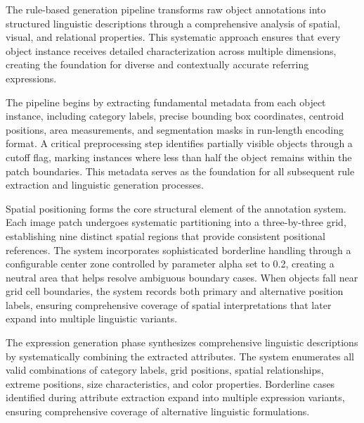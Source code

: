 The rule-based generation pipeline transforms raw object annotations into structured linguistic descriptions through a comprehensive analysis of spatial, visual, and relational properties. This systematic approach ensures that every object instance receives detailed characterization across multiple dimensions, creating the foundation for diverse and contextually accurate referring expressions.

The pipeline begins by extracting fundamental metadata from each object instance, including category labels, precise bounding box coordinates, centroid positions, area measurements, and segmentation masks in run-length encoding format. A critical preprocessing step identifies partially visible objects through a cutoff flag, marking instances where less than half the object remains within the patch boundaries. This metadata serves as the foundation for all subsequent rule extraction and linguistic generation processes.

Spatial positioning forms the core structural element of the annotation system. Each image patch undergoes systematic partitioning into a three-by-three grid, establishing nine distinct spatial regions that provide consistent positional references. The system incorporates sophisticated borderline handling through a configurable center zone controlled by parameter alpha set to 0.2, creating a neutral area that helps resolve ambiguous boundary cases. When objects fall near grid cell boundaries, the system records both primary and alternative position labels, ensuring comprehensive coverage of spatial interpretations that later expand into multiple linguistic variants.

The expression generation phase synthesizes comprehensive linguistic descriptions by systematically combining the extracted attributes. The system enumerates all valid combinations of category labels, grid positions, spatial relationships, extreme positions, size characteristics, and color properties. Borderline cases identified during attribute extraction expand into multiple expression variants, ensuring comprehensive coverage of alternative linguistic formulations.

